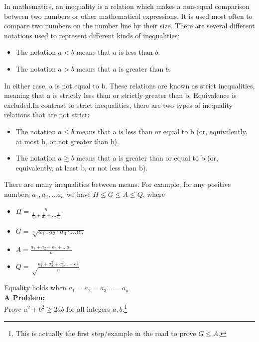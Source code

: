 \begin{mathbox}{}
    {In mathematics, an inequality is a relation which makes a non-equal comparison between two numbers or other mathematical expressions.
    It is used most often to compare two numbers on the number line by their size. There are several different notations used to represent different kinds of inequalities:
    \begin{itemize}
        \item{The notation $a < b$ means that $a$ is less than $b$.}
        \item{The notation $a > b$ means that $a$ is greater than $b$.}
    \end{itemize}
    In either case, a is not equal to b. These relations are known as strict inequalities, meaning that a is strictly less than or strictly greater than b. Equivalence is excluded.In contrast to strict inequalities, there are two types of inequality relations that are not strict:
    \begin{itemize}
        \item{The notation $a \leq b$  means that a is less than or equal to b (or, equivalently, at most b, or not greater than b).}
        \item{The notation $a \geq b$  means that a is greater than or equal to b (or, equivalently, at least b, or not less than b).}
    \end{itemize}
    There are many inequalities between means. For example, for any positive numbers $a_1, a_2, \dots a_n$ we have $H \leq G \leq A \leq Q$, where
    \begin{itemize}
        \item{$H = \frac{n}{\frac{1}{a_1} + \frac{1}{a_2} + \dots \frac{1}{a_n}}$}
        \vspace{0.4em}
        \item{$G = \sqrt[n]{a_1 \cdot a_2 \cdot a_3 \cdot \dots a_n}$}
        \item{$A = \frac{a_1 + a_2 + a_3 + \dots a_n}{n}$}
        \vspace{0.4em}
        \item{$Q = \sqrt \frac{a_1^2 + a_2^2 + a_3^2 \dots + a_n^2}{n}$}
    \end{itemize}
    Equality holds when $a_1 = a_2 = a_3 \dots = a_n$\\
    \textbf{A Problem:}\\
    Prove $a^2 + b^2 \geq 2ab$ for all integers $a, b$.\footnote{This is actually the first step/example in the road to prove $G \leq A.$}}
\end{mathbox}
